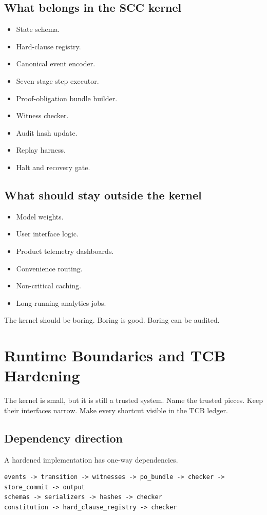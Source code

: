 \documentclass[11pt,oneside]{article}
\begin{document}
\subsection{What belongs in the SCC kernel}
\begin{itemize}
\item State schema.
\item Hard-clause registry.
\item Canonical event encoder.
\item Seven-stage step executor.
\item Proof-obligation bundle builder.
\item Witness checker.
\item Audit hash update.
\item Replay harness.
\item Halt and recovery gate.
\end{itemize}

\subsection{What should stay outside the kernel}
\begin{itemize}
\item Model weights.
\item User interface logic.
\item Product telemetry dashboards.
\item Convenience routing.
\item Non-critical caching.
\item Long-running analytics jobs.
\end{itemize}

The kernel should be boring. Boring is good. Boring can be audited.

\section{Runtime Boundaries and TCB Hardening}
The kernel is small, but it is still a trusted system. Name the trusted pieces. Keep their interfaces narrow. Make every shortcut visible in the TCB ledger.

\subsection{Dependency direction}
A hardened implementation has one-way dependencies.

\begin{lstlisting}[caption={Allowed dependency direction.}]
events -> transition -> witnesses -> po_bundle -> checker -> store_commit -> output
schemas -> serializers -> hashes -> checker
constitution -> hard_clause_registry -> checker
\end{lstlisting}
\end{document}
